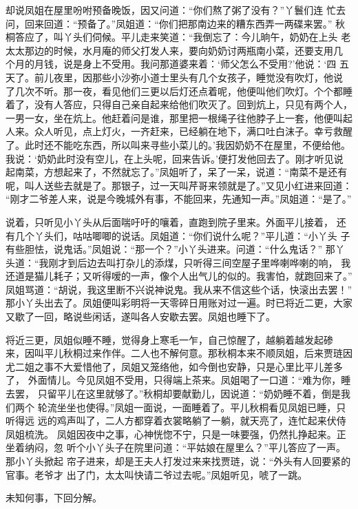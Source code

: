 却说凤姐在屋里吩咐预备晚饭，因又问道：“你们熬了粥了没有？”丫鬟们连
忙去问，回来回道：“预备了。”凤姐道：“你们把那南边来的糟东西弄一两碟来罢。”
秋桐答应了，叫丫头们伺候。平儿走来笑道：“我倒忘了：今儿晌午，奶奶在上头
老太太那边的时候，水月庵的师父打发人来，要向奶奶讨两瓶南小菜，还要支用几
个月的月钱，说是身上不受用。我问那道婆来着：‘师父怎么不受用?’他说：‘四
五天了。前儿夜里，因那些小沙弥小道士里头有几个女孩子，睡觉没有吹灯，他说
了几次不听。那一夜，看见他们三更以后灯还点着呢，他便叫他们吹灯。个个都睡
着了，没有人答应，只得自己亲自起来给他们吹灭了。回到炕上，只见有两个人，
一男一女，坐在炕上。他赶着问是谁，那里把一根绳子往他脖子上一套，他便叫起
人来。众人听见，点上灯火，一齐赶来，已经躺在地下，满口吐白沫子。幸亏救醒
了。此时还不能吃东西，所以叫来寻些小菜儿的。’我因奶奶不在屋里，不便给他。
我说：‘奶奶此时没有空儿，在上头呢，回来告诉。’便打发他回去了。刚才听见说
起南菜，方想起来了，不然就忘了。”凤姐听了，呆了一呆，说道：“南菜不是还有
呢，叫人送些去就是了。那银子，过一天叫芹哥来领就是了。”又见小红进来回道：
“刚才二爷差人来，说是今晚城外有事，不能回来，先通知一声。”凤姐道：“是了。”

说着，只听见小丫头从后面喘吁吁的嚷着，直跑到院子里来。外面平儿接着，
还有几个丫头们，咕咕唧唧的说话。凤姐道：“你们说什么呢？”平儿道：“小丫头
子有些胆怯，说鬼话。”凤姐说：“那一个？”小丫头进来。问道：“什么鬼话？”
那丫头道：“我刚才到后边去叫打杂儿的添煤，只听得三间空屋子里哗喇哗喇的响，
我还道是猫儿耗子；又听得嗳的一声，像个人出气儿的似的。我害怕，就跑回来了。”
凤姐骂道：“胡说，我这里断不兴说神说鬼。我从来不信这些个话，快滚出去罢！”
那小丫头出去了。凤姐便叫彩明将一天零碎日用账对过一遍。时已将近二更，大家
又歇了一回，略说些闲话，遂叫各人安歇去罢。凤姐也睡下了。

将近三更，凤姐似睡不睡，觉得身上寒毛一乍，自己惊醒了，越躺着越发起碜
来，因叫平儿秋桐过来作伴。二人也不解何意。那秋桐本来不顺凤姐，后来贾琏因
尤二姐之事不大爱惜他了，凤姐又笼络他，如今倒也安静，只是心里比平儿差多了，
外面情儿。今见凤姐不受用，只得端上茶来。凤姐喝了一口道：“难为你，睡去罢，
只留平儿在这里就够了。”秋桐却要献勤儿，因说道：“奶奶睡不着，倒是我们两个
轮流坐坐也使得。”凤姐一面说，一面睡着了。平儿秋桐看见凤姐已睡，只听得远
远的鸡声叫了，二人方都穿着衣裳略躺了一躺，就天亮了，连忙起来伏侍凤姐梳洗。
凤姐因夜中之事，心神恍惚不宁，只是一味要强，仍然扎挣起来。正坐着纳闷，忽
听个小丫头子在院里问道：“平姑娘在屋里么？”平儿答应了一声。那小丫头掀起
帘子进来，却是王夫人打发过来来找贾琏，说：“外头有人回要紧的官事。老爷才
出了门，太太叫快请二爷过去呢。”凤姐听见，唬了一跳。

未知何事，下回分解。
